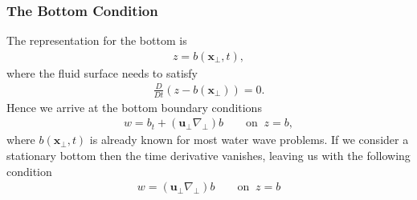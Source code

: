 \subsubsection{The Bottom Condition}
The representation for the bottom is
\begin{align}
   z = b(\mathbf{x}_\perp, t),
\end{align}
where the fluid surface needs to satisfy
\begin{align}
    \frac{D}{Dt} \left(z - b(\mathbf{x}_\perp) \right)  = 0.
\end{align}
Hence we arrive at the bottom boundary conditions
\begin{align}
    w = b_t + (\mathbf{u}_\perp \nabla_\perp)b \qquad \text{on}\;\; z=b ,
\end{align}
where $b(\mathbf{x}_\perp, t)$ is already known for most water wave
problems. If we consider a stationary bottom then the time derivative
vanishes, leaving us with the following condition
\begin{align}
    w = (\mathbf{u}_\perp \nabla_\perp)b \qquad \text{on}\;\; z=b
\end{align}


